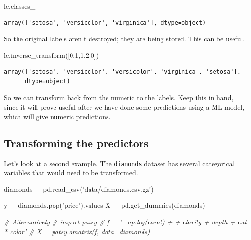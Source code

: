 \documentclass[
  letterpaper,
]{scrbook}
\newenvironment{Shaded}{\begin{snugshade}}{\end{snugshade}}
\newcommand{\CommentTok}[1]{\textcolor[rgb]{0.56,0.35,0.01}{\textit{#1}}}
\newcommand{\DecValTok}[1]{\textcolor[rgb]{0.00,0.00,0.81}{#1}}
\newcommand{\NormalTok}[1]{#1}
\newcommand{\OperatorTok}[1]{\textcolor[rgb]{0.81,0.36,0.00}{\textbf{#1}}}
\newcommand{\StringTok}[1]{\textcolor[rgb]{0.31,0.60,0.02}{#1}}
\begin{document}
\begin{Shaded}
\begin{Highlighting}[]
\NormalTok{le.classes_}
\end{Highlighting}
\end{Shaded}

\begin{verbatim}
array(['setosa', 'versicolor', 'virginica'], dtype=object)
\end{verbatim}

So the original labels aren't destroyed; they are being stored. This can be useful.

\begin{Shaded}
\begin{Highlighting}[]
\NormalTok{le.inverse_transform([}\DecValTok{0}\NormalTok{,}\DecValTok{1}\NormalTok{,}\DecValTok{1}\NormalTok{,}\DecValTok{2}\NormalTok{,}\DecValTok{0}\NormalTok{])}
\end{Highlighting}
\end{Shaded}

\begin{verbatim}
array(['setosa', 'versicolor', 'versicolor', 'virginica', 'setosa'],
      dtype=object)
\end{verbatim}

So we can transform back from the numeric to the labels. Keep this in hand, since it will prove useful after
we have done some predictions using a ML model, which will give numeric predictions.

\hypertarget{transforming-the-predictors}{%
\subsection{Transforming the predictors}\label{transforming-the-predictors}}

Let's look at a second example. The \texttt{diamonds} dataset has several categorical variables that would need to be transformed.

\begin{Shaded}
\begin{Highlighting}[]
\NormalTok{diamonds }\OperatorTok{=}\NormalTok{ pd.read_csv(}\StringTok{'data/diamonds.csv.gz'}\NormalTok{)}

\NormalTok{y }\OperatorTok{=}\NormalTok{ diamonds.pop(}\StringTok{'price'}\NormalTok{).values}
\NormalTok{X }\OperatorTok{=}\NormalTok{ pd.get_dummies(diamonds)}

\CommentTok{# Alternatively}
\CommentTok{# import patsy}
\CommentTok{# f = '~ np.log(carat) +  + clarity + depth + cut * color'}
\CommentTok{# X = patsy.dmatrix(f, data=diamonds)}
\end{Highlighting}
\end{Shaded}
\end{document}
